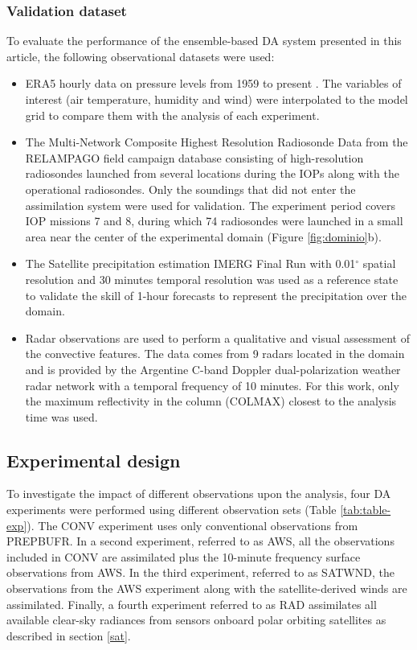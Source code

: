 \documentclass[preprint, 3p, authoryear,review, 12pt]{elsarticle} %
\begin{document}
\hypertarget{validation-dataset}{%
\subsubsection{Validation dataset}\label{validation-dataset}}

To evaluate the performance of the ensemble-based DA system presented in this article, the following observational datasets were used:

\begin{itemize}
\item
  ERA5 hourly data on pressure levels from 1959 to present \citep{era5pressure}. The variables of interest (air temperature, humidity and wind) were interpolated to the model grid to compare them with the analysis of each experiment.
\item
  The Multi-Network Composite Highest Resolution Radiosonde Data \citep{sondeos} from the RELAMPAGO field campaign database consisting of high-resolution radiosondes launched from several locations during the IOPs along with the operational radiosondes. Only the soundings that did not enter the assimilation system were used for validation. The experiment period covers IOP missions 7 and 8, during which 74 radiosondes were launched in a small area near the center of the experimental domain (Figure \ref{fig:dominio}b).
\item
  The Satellite precipitation estimation IMERG Final Run with 0.01\(^{\circ}\) spatial resolution and 30 minutes temporal resolution \citep{huffman2018} was used as a reference state to validate the skill of 1-hour forecasts to represent the precipitation over the domain.
\item
  Radar observations are used to perform a qualitative and visual assessment of the convective features. The data comes from 9 radars located in the domain and is provided by the Argentine C-band Doppler dual-polarization weather radar network \citep{deelia2017} with a temporal frequency of 10 minutes. For this work, only the maximum reflectivity in the column (COLMAX) closest to the analysis time was used.
\end{itemize}

\hypertarget{exp}{%
\subsection{Experimental design}\label{exp}}

To investigate the impact of different observations upon the analysis, four DA experiments were performed using different observation sets (Table \ref{tab:table-exp}). The CONV experiment uses only conventional observations from PREPBUFR. In a second experiment, referred to as AWS, all the observations included in CONV are assimilated plus the 10-minute frequency surface observations from AWS. In the third experiment, referred to as SATWND, the observations from the AWS experiment along with the satellite-derived winds are assimilated. Finally, a fourth experiment referred to as RAD assimilates all available clear-sky radiances from sensors onboard polar orbiting satellites as described in section \ref{sat}.
\end{document}
